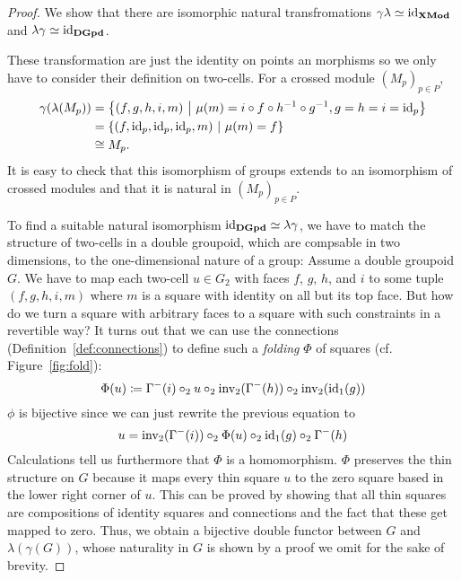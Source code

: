 \begin{proof}
We show that there are isomorphic natural transfromations $\gamma \lambda \simeq \operatorname{id}_{\mathbf{XMod}}$
and $\lambda \gamma \simeq \operatorname{id}_{\mathbf{DGpd}}$.

These transformation are just the identity on points an morphisms so we only have
to consider their definition on two-cells.
For a crossed module $(M_p)_{p \in P}$,
\begin{align*}
\gamma(\lambda(M_p)) &= \left\{ (f,g,h,i,m) ~\middle|~
	\mu(m) = i \circ f \circ h^{-1} \circ g^{-1}, g = h = i = \operatorname{id}_p \right\} \\
	&= \{ (f, \operatorname{id}_p, \operatorname{id}_p, \operatorname{id}_p, m) ~|~ \mu(m) = f\} \\
	&\cong M_p \text{.}
\end{align*}
It is easy to check that this isomorphism of groups extends to an isomorphism
of crossed modules and that it is natural in $(M_p)_{p \in P}$.

To find a suitable natural isomorphism $\operatorname{id}_{\mathbf{DGpd}} \simeq \lambda \gamma$,
we have to match the structure of two-cells in a double groupoid, which are
compsable in two dimensions, to the one-dimensional nature of a group:
Assume a double groupoid $G$.
We have to map each two-cell $u \in G_2$ with faces $f$, $g$, $h$, and $i$ to
some tuple $(f,g,h,i,m)$ where $m$ is a square with identity on all but its top
face.
But how do we turn a square with arbitrary faces to a square with such constraints
in a revertible way?
It turns out that we can use the connections (Definition~\ref{def:connections})
to define such a \emph{folding} $\Phi$ of squares (cf. Figure~\ref{fig:fold}):
\begin{equation*}
\Phi(u) \coloneqq
	\Gamma^-(i) \circ_2 u \circ_2 \operatorname{inv_2}(\Gamma^-(h)) \circ_2 \operatorname{inv_2}(\operatorname{id}_1(g))
\end{equation*}
$\phi$ is bijective since we can just rewrite the previous equation to
\begin{equation*}
u = \operatorname{inv_2}(\Gamma^-(i)) \circ_2 \Phi(u) \circ_2 \operatorname{id}_1(g) \circ_2 \Gamma^-(h)
\end{equation*}
Calculations tell us furthermore that $\Phi$ is a homomorphism.
$\Phi$ preserves the thin structure on $G$ because it maps every thin square $u$
to the zero square based in the lower right corner of $u$.
This can be proved by showing that all thin squares are compositions of identity
squares and connections and the fact that these get mapped to zero.
Thus, we obtain a bijective double functor between $G$ and $\lambda(\gamma(G))$,
whose naturality in $G$ is shown by a proof we omit for the sake of brevity.
\end{proof}

